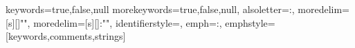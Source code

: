 \makeatletter
\ifdefined\@UsingAppendix
\usepackage[titletoc]{appendix}
\renewcommand\appendixname{附录}
\renewcommand\appendixpagename{附录}
\appendixtitleon
\else
\relax
\fi
\makeatother

\makeatletter
\ifdefined\@RequestArgColor
\def\reqargclr#1{\item[{\quad\colorbox[rgb]{1.00,0.90,1.00}{#1}}]}
\fi
\makeatother


\makeatletter

\ifdefined\@FootnoteWithPage
\usepackage{chngcntr}
\renewcommand\thefootnote{\theparagraph-\alph{footnote}}
\fi
\makeatother


\makeatletter
\ifdefined\@NoPackageListings
\relax
\else
\ifdefined\@lst@json@define
{}
{
    keywords={true,false,null}
}
\fi
{}%
{
    morekeywords={true,false,null},%
    alsoletter={:},
    moredelim=[s][{\color[rgb]{0.67,0.00,0.67}}]{"}{"},
    moredelim=[s][{\color[rgb]{0.36,0.67,0.78}}]{:"}{"},%
    identifierstyle=\color{blue},
    emph={:}, emphstyle=\color{red}
}[keywords,comments,strings]%
\fi
\makeatother
